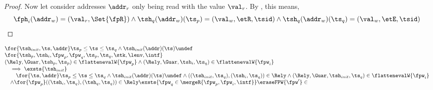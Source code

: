 \begin{proof}
Now let consider addresses \( \addr_{r} \) only being read with the value \( \val_{r} \).
By , this means,
\begin{equation}
\label{equ:global-read}
\fph_{i}(\addr_{w}) = ( \val_{r}, \Set{\fpR})
\land \tsh_{q}(\addr_{w})(\ts_{p}) = (\val_{w}, \etR, \tsid)
\land \tsh_{q}(\addr_{w})(\ts_{q}) = (\val_{w}, \etE, \tsid)
\end{equation}
\end{proof}

\begin{lem}
\label{lem:merge-sound}
\[
\begin{array}{@{}l@{}}
    \for{\tsh_{init}, \ts, \addr}
    \ts_{p} \leq \ts \leq \ts_{q} 
    \land \tsh_{init}(\addr)(\ts)\undef \\
    \for{\tsh_{p}, \tsh_{i}, \fpw_{p}, \fpw_{q}, \ts_{p}, \ts_{q}, \stk, \lenv, \intf}  \\
    (\Rely, \Guar, \tsh_{p}, \ts_{p}) \in \flattenevalW{\fpw_{p}}
    \land (\Rely, \Guar, \tsh_{i}, \ts_{q}) \in \flattenevalW{\fpw_{i}} \\
    \quad \implies \exsts{\tsh_{init}} \\
    \qquad \for{\ts, \addr}
    \ts_{p} \leq \ts \leq \ts_{q} 
    \land \tsh_{init}(\addr)(\ts)\undef 
    \land ((\tsh_{init}, \ts_{q}), (\tsh_{i}, \ts_{q})) \in \Rely 
    \land (\Rely, \Guar, \tsh_{init}, \ts_{q}) \in \flattenevalW{\fpw_{i}} \\
    \quad \land \for{\fpw_{p} } ((\tsh_{i}, \ts_{q}), (\tsh_{q}, \ts_{q})) \in \Rely  \exsts{\fpw_{q} \in \mergeR{\fpw_{p}, \fpw_{i}, \intf }} \eraseFPW{\fpw'} \in
\end{array}
\]
\end{lem}


